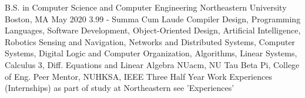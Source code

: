 

\begin{cveducation}
  \cvedu
    {B.S. in Computer Science and Computer Engineering} %
    {Northeastern University} %
    {Boston, MA} %
    {May 2020} %
    { 3.99 - Summa Cum Laude} %
    { %
    	Compiler Design,
        Programming Languages, 
        Software Development, 
        Object-Oriented Design,
        Artificial Intelligence, 
        Robotics Sensing and Navigation, 
   	 	Networks and Distributed Systems,
        Computer Systems,
     	Digital Logic and Computer Organization,
     	Algorithms, 
     	Linear Systems,
        Calculus 3,
     	Diff. Equations and Linear Algebra
    }
    { %
        NUacm,
        NU Tau Beta Pi,
        College of Eng. Peer Mentor,
        NUHKSA,
        IEEE
    }
    { %
      Three Half Year Work Experiences (Internships) as part of
      study at Northeastern see 'Experiences'
    }
\end{cveducation}
